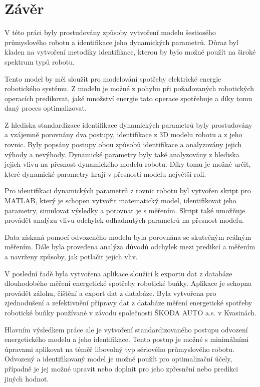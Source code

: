 \chapter{Závěr}

V této práci byly prostudovány způsoby vytvoření modelu šestiosého průmyslového robotu a identifikace jeho dynamických parametrů. Důraz byl kladen na vytvoření metodiky identifikace, kterou by bylo možné použít na široké spektrum typů robotu. 

Tento model by měl sloužit pro modelování spotřeby elektrické energie robotického systému. Z modelu je možné z pohybu při požadovaných robotických operacích predikovat, jaké množství energie tato operace spotřebuje a díky tomu daný proces optimalizovat.

Z hlediska standardizace identifikace dynamických parametrů byly prostudovány a vzájemně porovnány dva postupy, identifikace z 3D modelu robotu a z jeho rovnic. Byly popsány postupy obou způsobů identifikace a analyzovány jejich výhody a nevýhody. Dynamické parametry byly také analyzovány z hlediska jejich vlivu na přesnost dynamického modelu robotu. Díky tomu je možné určit, které dynamické parametry hrají v přesnosti modelu největší roli. 

Pro identifikaci dynamických parametrů z rovnic robotu byl vytvořen skript pro MATLAB, který je schopen vytvořit matematický model, identifikovat jeho parametry, simulovat výsledky a porovnat je s měřením. Skript také umožňuje provádět analýzu vlivu odchylek odhadnutých parametrů na přesnost modelu. 

Data získaná pomocí odvozeného modelu byla porovnána se skutečným reálným měřením. Dále byla provedena analýza důvodů odchylek mezi predikcí a měřením a navrženy způsoby, jak potlačit jejich vliv.  

V poslední řadě byla vytvořena aplikace sloužící k exportu dat z databáze dlouhodobého měření energetické spotřeby robotické buňky. Aplikace je schopna provádět zálohu, čištění a export dat z databáze. Byla vytvořena pro zjednodušení a zefektivnění přípravy dat z databáze měření energetické spotřeby robotické buňky používané v závodu společnosti ŠKODA AUTO a.s. v Kvasinách. 

Hlavním výsledkem práce ale je vytvoření standardizovaného postupu odvození energetického modelu a jeho identifikace. Tento postup je možné s minimálními úpravami aplikovat na téměř libovolný typ sériového průmyslového robotu. Odvozený a identifikovaný model je možné použít pro optimalizační účely, případně je jej možné upravit nebo doplnit pro jeho zpřesnění nebo predikci jiných hodnot.

